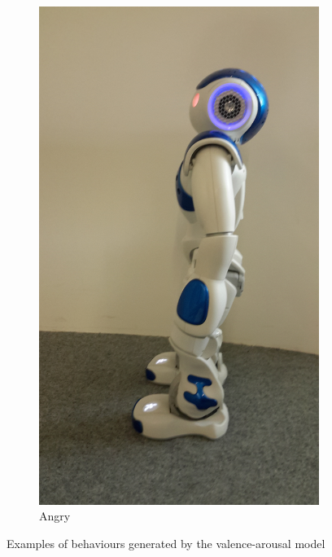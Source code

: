 \begin{figure}[h!]
\begin{subfigure}[b]{0.18\textwidth}
                \includegraphics[width=\textwidth]{figures/angry.jpg}
                \caption{Angry}
                \label{fig:angry}
        \end{subfigure}
		\caption{Examples of behaviours generated by the valence-arousal model}\label{fig:behaviours}
\end{figure}
